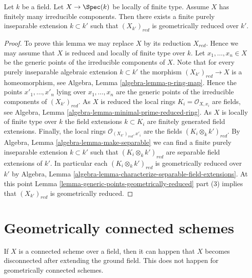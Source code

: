 \begin{lemma}
\label{lemma-finite-extension-geometrically-reduced}
Let $k$ be a field.
Let $X \to \Spec(k)$ be locally of finite type.
Assume $X$ has finitely many irreducible components.
Then there exists a finite purely inseparable extension $k \subset k'$
such that $(X_{k'})_{red}$ is geometrically reduced over $k'$.
\end{lemma}

\begin{proof}
To prove this lemma we may replace $X$ by its reduction $X_{red}$.
Hence we may assume that $X$ is reduced and locally of finite type
over $k$.
Let $x_1, \ldots, x_n \in X$ be the generic points of the irreducible
components of $X$.
Note that for every purely inseparable algebraic extension $k \subset k'$
the morphism $(X_{k'})_{red} \to X$ is a homeomorphism, see
Algebra, Lemma \ref{algebra-lemma-p-ring-map}. Hence the points
$x'_1, \ldots, x'_n$ lying over $x_1, \ldots, x_n$ are the generic
points of the irreducible components of $(X_{k'})_{red}$.
As $X$ is reduced the local rings $K_i = \mathcal{O}_{X, x_i}$ are fields, see
Algebra, Lemma \ref{algebra-lemma-minimal-prime-reduced-ring}.
As $X$ is locally of finite type over $k$ the field extensions
$k \subset K_i$ are finitely generated field extensions.
Finally, the local rings $\mathcal{O}_{(X_{k'})_{red}, x'_i}$ are the
fields $(K_i \otimes_k k')_{red}$. By
Algebra, Lemma \ref{algebra-lemma-make-separable}
we can find a finite purely inseparable extension $k \subset k'$
such that $(K_i \otimes_k k')_{red}$ are separable field
extensions of $k'$. In particular each $(K_i \otimes_k k')_{red}$
is geometrically reduced over $k'$ by
Algebra, Lemma \ref{algebra-lemma-characterize-separable-field-extensions}.
At this point
Lemma \ref{lemma-generic-points-geometrically-reduced} part (3)
implies that $(X_{k'})_{red}$ is geometrically reduced.
\end{proof}







\section{Geometrically connected schemes}
\label{section-geometrically-connected}

\noindent
If $X$ is a connected scheme over a field, then it can happen that $X$
becomes disconnected after extending the ground field. This does not happen
for geometrically connected schemes.

